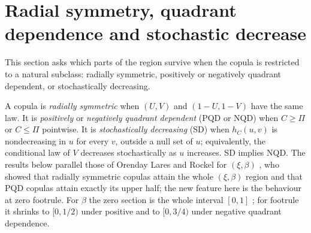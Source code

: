 \documentclass[11pt,a4paper]{article}
\theoremstyle{remark}
\newcommand{\1}{\mathbf 1}
\begin{document}
\section{Radial symmetry, quadrant dependence and stochastic decrease}\label{sec:classes}
This section asks which parts of the region survive when the copula is restricted to a natural subclass: radially symmetric, positively or negatively quadrant dependent, or stochastically decreasing.

A copula is \emph{radially symmetric} when $(U,V)$ and $(1-U,1-V)$ have the same law. It is \emph{positively} or \emph{negatively quadrant dependent} (PQD or NQD) when $C\ge\Pi$ or $C\le\Pi$ pointwise. It is \emph{stochastically decreasing} (SD) when $h_C(u,v)$ is nondecreasing in $u$ for every $v$, outside a null set of $u$; equivalently, the conditional law of $V$ decreases stochastically as $u$ increases. SD implies NQD. The results below parallel those of Orenday Lares and Rockel for $(\xi,\beta)$ \cite{olr}, who showed that radially symmetric copulas attain the whole $(\xi,\beta)$ region and that PQD copulas attain exactly its upper half; the new feature here is the behaviour at zero footrule. For $\beta$ the zero section is the whole interval $[0,1]$ \cite{olr}; for footrule it shrinks to $[0,1/2)$ under positive and to $[0,3/4)$ under negative quadrant dependence.
\end{document}
